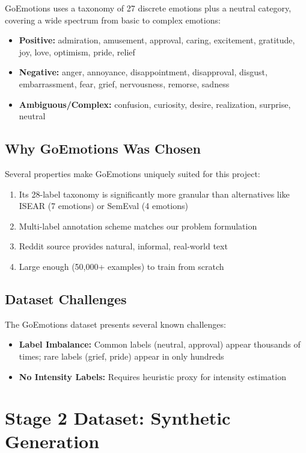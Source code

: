 \documentclass[12pt, a4paper]{report}
\begin{document}
GoEmotions uses a taxonomy of 27 discrete emotions plus a neutral category, covering a wide spectrum from basic to complex emotions:

\begin{itemize}
    \item \textbf{Positive:} admiration, amusement, approval, caring, excitement, gratitude, joy, love, optimism, pride, relief
    \item \textbf{Negative:} anger, annoyance, disappointment, disapproval, disgust, embarrassment, fear, grief, nervousness, remorse, sadness
    \item \textbf{Ambiguous/Complex:} confusion, curiosity, desire, realization, surprise, neutral
\end{itemize}

\subsection{Why GoEmotions Was Chosen}

Several properties make GoEmotions uniquely suited for this project:
\begin{enumerate}
    \item Its 28-label taxonomy is significantly more granular than alternatives like ISEAR (7 emotions) or SemEval (4 emotions)
    \item Multi-label annotation scheme matches our problem formulation
    \item Reddit source provides natural, informal, real-world text
    \item Large enough (50,000+ examples) to train from scratch
\end{enumerate}

\subsection{Dataset Challenges}

The GoEmotions dataset presents several known challenges:
\begin{itemize}
    \item \textbf{Label Imbalance:} Common labels (neutral, approval) appear thousands of times; rare labels (grief, pride) appear in only hundreds
    \item \textbf{No Intensity Labels:} Requires heuristic proxy for intensity estimation
\end{itemize}

\section{Stage 2 Dataset: Synthetic Generation}
\end{document}
